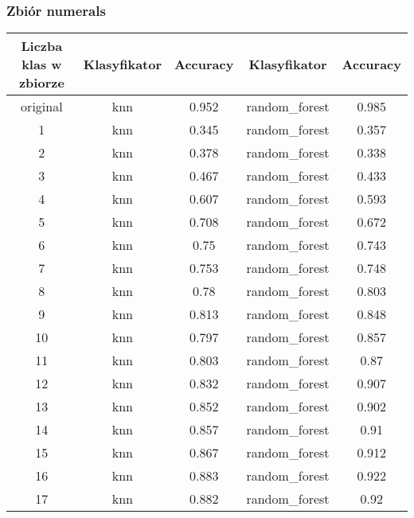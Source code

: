 \documentclass{classrep}
\begin{document}
{{            \subsubsection{Zbiór numerals} {
                \begin{table}[!htbp]
                    \centering
                    \begin{tabular}{|c|c|c|c|c|}
                        \hline
                        Liczba klas w zbiorze & Klasyfikator & Accuracy & Klasyfikator & Accuracy \\ \hline
                        original & knn & 0.952 & random\_forest & 0.985 \\ \hline
                        1 & knn & 0.345 & random\_forest & 0.357 \\ \hline
                        2 & knn & 0.378 & random\_forest & 0.338 \\ \hline
                        3 & knn & 0.467 & random\_forest & 0.433 \\ \hline
                        4 & knn & 0.607 & random\_forest & 0.593 \\ \hline
                        5 & knn & 0.708 & random\_forest & 0.672 \\ \hline
                        6 & knn & 0.75 & random\_forest & 0.743 \\ \hline
                        7 & knn & 0.753 & random\_forest & 0.748 \\ \hline
                        8 & knn & 0.78 & random\_forest & 0.803 \\ \hline
                        9 & knn & 0.813 & random\_forest & 0.848 \\ \hline
                        10 & knn & 0.797 & random\_forest & 0.857 \\ \hline
                        11 & knn & 0.803 & random\_forest & 0.87 \\ \hline
                        12 & knn & 0.832 & random\_forest & 0.907 \\ \hline
                        13 & knn & 0.852 & random\_forest & 0.902 \\ \hline
                        14 & knn & 0.857 & random\_forest & 0.91 \\ \hline
                        15 & knn & 0.867 & random\_forest & 0.912 \\ \hline
                        16 & knn & 0.883 & random\_forest & 0.922 \\ \hline
                        17 & knn & 0.882 & random\_forest & 0.92 \\ \hline

\end{tabular}
\end{table}}}}
\end{document}
